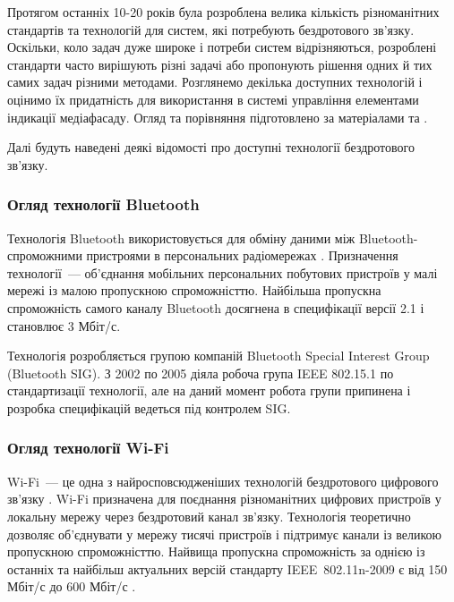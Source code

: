 \documentclass[a4paper,ukrainian,utf8,nocolumnsxix,floatsection,equationsection]{eskdtext}
\renewcommand\paragraph{\subsubsection}
\begin{document}
Протягом останніх 10-20 років була розроблена велика кількість різноманітних стандартів та технологій для систем, які потребують бездротового зв’язку. Оскільки, коло задач дуже широке і потреби систем відрізняються, розроблені стандарти часто вирішують різні задачі або пропонують рішення одних й тих самих задач різними методами. Розглянемо декілька доступних технологій і оцінимо їх придатність для використання в системі управління елементами індикації медіафасаду. Огляд та порівняння підготовлено за матеріалами \cite{comparative:wireless:protocols} та \cite{garcia2008:problem:solving}.

Далі будуть наведені деякі відомості про доступні технології бездротового зв’язку.

\paragraph{Огляд технології Bluetooth} %
\label{par:bluetooth_bluetooth_low_energy}

Технологія Bluetooth використовується для обміну даними між Bluetooth-спроможними пристроями в персональних радіомережах \cite{garcia2008:problem:solving}. Призначення технології~--- об’єднання мобільних персональних побутових пристроїв у малі мережі із малою пропускною спроможністтю. Найбільша пропускна спроможність самого каналу Bluetooth досягнена в специфікації версії 2.1 \cite{bluetooth:core:spec:2_1} і становлює 3 Мбіт/с.

Технологія розробляється групою компаній Bluetooth Special Interest Group (Bluetooth SIG). З 2002 по 2005 діяла робоча група IEEE 802.15.1 по стандартизації технології, але на даний момент робота групи припинена і розробка специфікацій ведеться під контролем SIG.


\paragraph{Огляд технології Wi-Fi} %
\label{par:wi_fi}

Wi-Fi~--- це одна з найросповсюдженіших технологій бездротового цифрового зв’язку \cite{garcia2008:problem:solving}. Wi-Fi призначена для поєднання різноманітних цифрових пристроїв у локальну мережу через бездротовий канал зв’язку. Технологія теоретично дозволяє об’єднувати у мережу тисячі пристроїв і підтримує канали із великою пропускною спроможністтю. Найвища пропускна спроможність за однією із останніх та найбільш актуальних версій стандарту IEEE~802.11n-2009 є від 150 Мбіт/с до 600 Мбіт/с \cite{comparative:wireless:protocols}.
\end{document}

